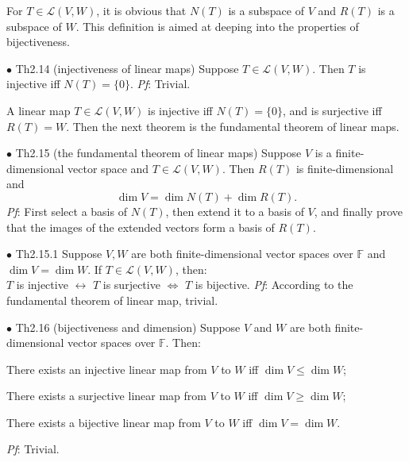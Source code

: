 \documentclass{article}
\begin{document}
\begin{Rmk}{}
    \textcolor{Th}{For $T\in\mathcal{L}(V, W)$, it is obvious that $N(T)$ is a subspace of $V$ and $R(T)$ is a subspace of $W$.} This definition is aimed at deeping into the properties of bijectiveness.
\end{Rmk}

\begin{Th}{$\bullet$ Th2.14 (injectiveness of linear maps)}
    Suppose $T\in\mathcal{L}(V, W)$. Then $T$ is injective iff $N(T) = \{0\}$.
    \tcblower
    \textit{Pf}: Trivial.
\end{Th}

\begin{Rmk}{}
    A linear map $T\in\mathcal{L}(V, W)$ is injective iff $N(T) = \{0\}$, and is surjective iff $R(T) = W$. Then the next theorem is the fundamental theorem of linear maps.
\end{Rmk}

\begin{Th}{$\bullet$ Th2.15 (the fundamental theorem of linear maps)}
    Suppose $V$ is a finite-dimensional vector space and $T\in\mathcal{L}(V, W)$. Then $R(T)$ is finite-dimensional and
    $$\dim V = \dim N(T) +\dim R(T).$$
    \tcblower
    \textit{Pf}: First select a basis of $N(T)$, then extend it to a basis of $V$, and finally prove that the images of the extended vectors form a basis of $R(T)$.
\end{Th}

\begin{Th}{$\bullet$ Th2.15.1}
    Suppose $V, W$ are both finite-dimensional vector spaces over $\mathbb{F}$ and $\dim V = \dim W$. If $T\in\mathcal{L}(V, W)$, then:\\
    $T$ is injective $\leftrightarrow$ $T$ is surjective $\Leftrightarrow$ $T$ is bijective.
    \textit{Pf}: According to the fundamental theorem of linear map, trivial.
\end{Th}

\begin{Th}{$\bullet$ Th2.16 (bijectiveness and dimension)}
    Suppose $V$ and $W$ are both finite-dimensional vector spaces over $\mathbb{F}$. Then:
    \begin{compactenum}
        \item There exists an injective linear map from $V$ to $W$ iff $\dim V\leq \dim W$;
        \item There exists a surjective linear map from $V$ to $W$ iff $\dim V\geq \dim W$;
        \item There exists a bijective linear map from $V$ to $W$ iff $\dim V = \dim W$.
    \end{compactenum}
    \tcblower
    \textit{Pf}: Trivial.
\end{Th}
\end{document}
